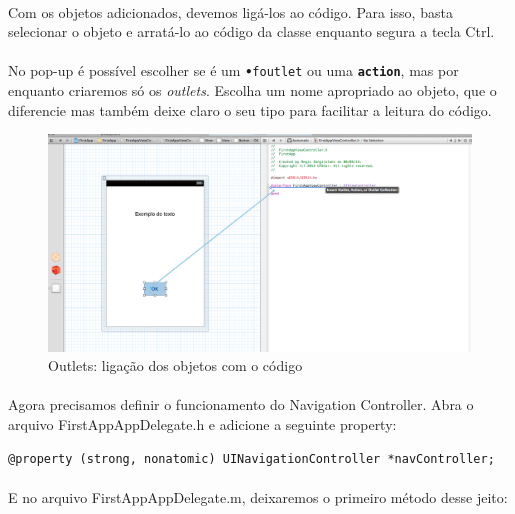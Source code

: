 \documentclass[a4paper,12pt,brazil,doubleside]{book}
\begin{document}
\paragraph{}Com os objetos adicionados, devemos ligá-los ao código. Para isso, basta selecionar o objeto e arratá-lo ao código da classe enquanto segura a tecla Ctrl.
\paragraph{}No pop-up é possível escolher se é um \texttt{\textbf{•}f{outlet}} ou uma \texttt{\textbf{action}}, mas por enquanto criaremos só os \emph{outlets}. Escolha um nome apropriado ao objeto, que o diferencie mas também deixe claro o seu tipo para facilitar a leitura do código.

\begin{figure}[h]
  \centering
  \includegraphics[totalheight=0.25\textheight]{../figuras/ios/1/link_outlet_button.png}
  \caption{Outlets: ligação dos objetos com o código}
  \label{fig:a}
\end{figure}

\paragraph{}Agora precisamos definir o funcionamento do Navigation Controller. Abra o arquivo FirstAppAppDelegate.h e adicione a seguinte property:

\begin{listing}
\begin{verbatim}
@property (strong, nonatomic) UINavigationController *navController;
\end{verbatim}
\end{listing}

\paragraph{}E no arquivo FirstAppAppDelegate.m, deixaremos o primeiro método desse jeito:
\end{document}
